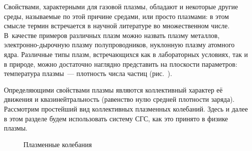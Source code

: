 
Свойствами, характерными для газовой плазмы, обладают и некоторые другие среды,
называемые по этой причине
 средами, или просто плазмами: в этом смысле термин
 встречается в научной литературе во множественном числе.
В~качестве примеров различных плазм можно назвать плазму металлов,
электронно-дырочную плазму полупроводников, нуклонную плазму атомного ядра.
Различные типы плазм, встречающихся как в лабораторных условиях,
так и в природе, можно достаточно наглядно представить на плоскости параметров:
температура плазмы~--- плотность числа частиц (рис.~).



\label{sec:plasma}

Определяющими свойствами плазмы являются коллективный характер её движения
и квазинейтральность (равенство нулю средней плотности заряда).
Рассмотрим простейший вид коллективных плазменных колебаний. Здесь и далее
в этом разделе будем использовать систему СГС, как это принято в физике плазмы.

\begin{wrapfigure}{o}{0.4\textwidth}
    \centering
    \caption{Плазменные колебания}
\end{wrapfigure}

